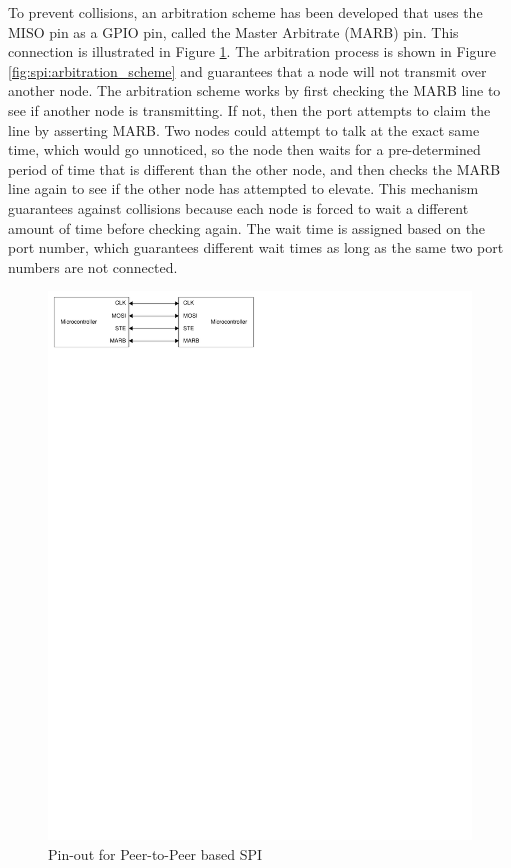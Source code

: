 To prevent collisions, an arbitration scheme has been developed that uses the MISO pin as a GPIO pin, called the Master Arbitrate (MARB) pin. This connection is illustrated in Figure \ref{fig:spi:p2p_pinout}. The arbitration process is shown in Figure \ref{fig:spi:arbitration_scheme} and guarantees that a node will not transmit over another node. The arbitration scheme works by first checking the MARB line to see if another node is transmitting. If not, then the port attempts to claim the line by asserting MARB. Two nodes could attempt to talk at the exact same time, which would go unnoticed, so the node then waits for a pre-determined period of time that is different than the other node, and then checks the MARB line again to see if the other node has attempted to elevate. This mechanism guarantees against collisions because each node is forced to wait a different amount of time before checking again. The wait time is assigned based on the port number, which guarantees different wait times as long as the same two port numbers are not connected.

\begin{figure}[ptb]
	\begin{centering}
		\includegraphics{SPI/Figures/spi-p2p_pinout.pdf}
		\caption{Pin-out for Peer-to-Peer based SPI}
		\label{fig:spi:p2p_pinout}
	\end{centering}
\end{figure}

